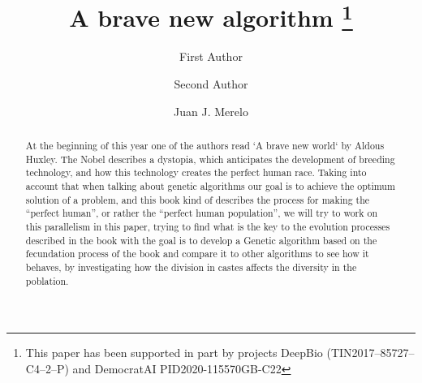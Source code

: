\documentclass[runningheads]{llncs}
\begin{document}
%
\title{A brave new algorithm \thanks{This paper has been supported in part by projects DeepBio (TIN2017--85727--C4--2--P) and DemocratAI PID2020-115570GB-C22}}
%
%
\author{First Author \and
Second Author \and
Juan J. Merelo}
%
%
%
\maketitle              %
%
\begin{abstract}

At the beginning of this year one of the authors read `A brave new
world` by Aldous Huxley.  The Nobel describes a dystopia, which
anticipates the development of breeding technology, and how this
technology creates the perfect human race. Taking into account that
when talking about genetic algorithms our goal is to achieve the
optimum solution of a problem, and this book kind of describes the
process for making the “perfect human”, or rather the ``perfect human
population'', we will try to work on this parallelism in this paper,
trying to find what is the key to the evolution processes described in
the book with the goal is to develop a Genetic algorithm based on the
fecundation process of the book and compare it to other algorithms to
see how it behaves, by investigating how the division in castes
affects the diversity in the poblation.

\end{abstract}

% 








\end{document}

